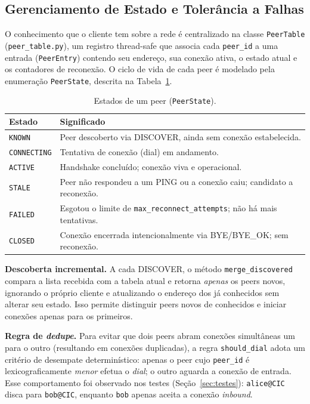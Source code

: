 \documentclass[12pt, a4paper]{article}
\begin{document}
\subsection{Gerenciamento de Estado e Tolerância a Falhas}
\label{subsubsec_estado}
O conhecimento que o cliente tem sobre a rede é centralizado na classe \texttt{PeerTable} (\texttt{peer\_table.py}), um registro thread-safe que associa cada \texttt{peer\_id} a uma entrada (\texttt{PeerEntry}) contendo seu endereço, sua conexão ativa, o estado atual e os contadores de reconexão. O ciclo de vida de cada peer é modelado pela enumeração \texttt{PeerState}, descrita na Tabela~\ref{tab:estados}.

\begin{table}[h]
\centering
\caption{Estados de um peer (\texttt{PeerState}).}
\label{tab:estados}
\begin{tabular}{|l|p{10cm}|}
\hline
\textbf{Estado} & \textbf{Significado} \\
\hline
\texttt{KNOWN} & Peer descoberto via DISCOVER, ainda sem conexão estabelecida. \\
\hline
\texttt{CONNECTING} & Tentativa de conexão (dial) em andamento. \\
\hline
\texttt{ACTIVE} & Handshake concluído; conexão viva e operacional. \\
\hline
\texttt{STALE} & Peer não respondeu a um PING ou a conexão caiu; candidato a reconexão. \\
\hline
\texttt{FAILED} & Esgotou o limite de \texttt{max\_reconnect\_attempts}; não há mais tentativas. \\
\hline
\texttt{CLOSED} & Conexão encerrada intencionalmente via BYE/BYE\_OK; sem reconexão. \\
\hline
\end{tabular}
\end{table}

\textbf{Descoberta incremental.} A cada DISCOVER, o método \texttt{merge\_discovered} compara a lista recebida com a tabela atual e retorna \textit{apenas} os peers novos, ignorando o próprio cliente e atualizando o endereço dos já conhecidos sem alterar seu estado. Isso permite distinguir peers novos de conhecidos e iniciar conexões apenas para os primeiros.

\textbf{Regra de \textit{dedupe}.} Para evitar que dois peers abram conexões simultâneas um para o outro (resultando em conexões duplicadas), a regra \texttt{should\_dial} adota um critério de desempate determinístico: apenas o peer cujo \texttt{peer\_id} é lexicograficamente \textit{menor} efetua o \textit{dial}; o outro aguarda a conexão de entrada. Esse comportamento foi observado nos testes (Seção~\ref{sec:testes}): \texttt{alice@CIC} disca para \texttt{bob@CIC}, enquanto \texttt{bob} apenas aceita a conexão \textit{inbound}.
\end{document}

